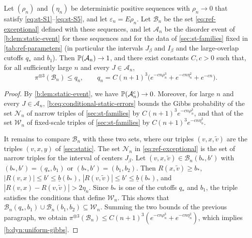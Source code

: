 \begin{lemma}
\label{lem:ref-single-event}
Let $(\rho_n)$ and $(\eta_n)$ be deterministic positive sequences with
$\rho_n\to0$ that satisfy \eqref{eq:st-S1}--\eqref{eq:st-S5}, and let
$\varepsilon_n=E\rho_n$. Let
$\mathcal B_n$ be the set \eqref{eq:ref-exceptional} defined with these
sequences, and let $\mathcal A_n$ be the disorder event of
\cref{b:lem:static-event} for these sequences and for the data of
\cref{sec:st-families} fixed in \cref{tab:ref-parameters} (in particular the
intervals $J_\beta$ and $I_\beta$ and the large-overlap cutoffs $q_*$ and
$b_1$). Then $\mathbb P(\mathcal A_n)\to1$, and there exist constants $C,c>0$ such
that, for all sufficiently large $n$ and every $J\in\mathcal A_n$,
\begin{equation}\label{b:dyn:uniform-gibbs}
 \pi^{\otimes3}(\mathcal B_n)\le q_n,\qquad
 q_n=C(n+1)^3\bigl(e^{-cn\rho_n^3}+e^{-cn\eta_n^2}+e^{-cn}\bigr).
\end{equation}
\end{lemma}

\begin{proof}
By \cref{b:lem:static-event}, we have $\mathbb P(\mathcal A_n^c)\to0$. Moreover,
for large $n$ and every $J\in\mathcal A_n$,
\eqref{b:eq:conditional-static-errors} bounds the Gibbs probability of the set
$\mathcal N_n$ of narrow triples of \cref{sec:st-families} by
$C(n+1)^3e^{-cn\rho_n^3}$, and that of the set $\mathcal W_n$ of fixed-scale
triples of \cref{sec:st-families} by $C(n+1)^3e^{-cn\eta_n^2}$.

It remains to compare $\mathcal B_n$ with these two sets, where our triples
$(v,x,{\widetilde v})$ are the triples $(v,x,y)$ of \cref{sec:static}. The set
$\mathcal N_n$ in \eqref{eq:ref-exceptional} is the set of narrow triples for
the interval of centers $J_\beta$. Let $(v,x,{\widetilde v})\in\mathcal B_n(b_*,b')$ with
$(b_*,b')=(q_*,b_1)$ or $(b_*,b')=(b_1,b_2)$. Then $R(x,{\widetilde v})\ge b_*$,
$|R(v,x)|\le b'\le\underline b(b_*)$, $|R(v,{\widetilde v})|\le b'\le\underline b(b_*)$,
and $|R(v,x)-R(v,{\widetilde v})|>2\eta_n$. Since $b_*$ is one of the cutoffs $q_*$ and
$b_1$, the triple satisfies the conditions that define $\mathcal W_n$. This
shows that $\mathcal B_n(q_*,b_1)\cup\mathcal B_n(b_1,b_2)\subseteq\mathcal W_n$.
Summing the two bounds of the previous paragraph, we obtain
$\pi^{\otimes3}(\mathcal B_n)\le C(n+1)^3(e^{-cn\rho_n^3}+e^{-cn\eta_n^2})$,
which implies \eqref{b:dyn:uniform-gibbs}.
\end{proof}


